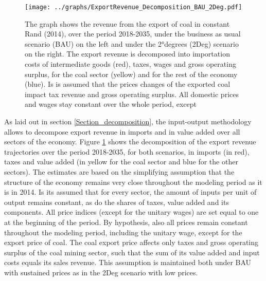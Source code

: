 \documentclass[12pt,english]{article}
\begin{document}
\begin{figure}[!b]
	\hspace{-10pt}\texttt{[image: ../graphs/ExportRevenue\_Decomposition\_BAU\_2Deg.pdf]}
	\caption{\label{ExportRevenue_Decomposition_Diff}\small The graph shows the revenue from the export of coal in constant Rand (2014), over the period 2018-2035, under the business as usual scenario (BAU) on the left and under the 2°degrees (2Deg) scenario on the right. The export revenue is decomposed into importation costs of intermediate goods (red), taxes, wages and gross operating surplus, for the coal sector (yellow) and for the rest of the economy (blue). Is is assumed that the prices changes of the exported coal impact tax revenue and gross operating surplus. All domestic prices and wages stay constant over the whole period, except  }
\end{figure}

As laid out in section \ref{Section_decomposition}, the input-output methodology allows to decompose export revenue in imports and in value added over all sectors of the economy. Figure \ref{ExportRevenue_Decomposition_Diff} shows the decomposition of the export revenue trajectories over the period 2018-2035, for both scenarios, in imports (in red), taxes and value added (in yellow for the coal sector and blue for the other sectors). %
The estimates are based on the simplifying assumption that the structure of the economy remains very close throughout the modeling period as it is in 2014. Is its assumed that for every sector, the amount of inputs per unit of output remains constant, as do the shares of taxes, value added and its components. All price indices (except for the unitary wages) are set equal to one at the beginning of the period. By hypothesis, also all prices remain constant throughout the modeling period, including the unitary wage, except for the export price of coal.
The coal export price affects only taxes and gross operating surplus of the coal mining sector, %
such that the sum of its value added and input costs equals its sales revenue. This assumption is maintained both under BAU with sustained prices as in the 2Deg scenario with low prices. 
\end{document}
